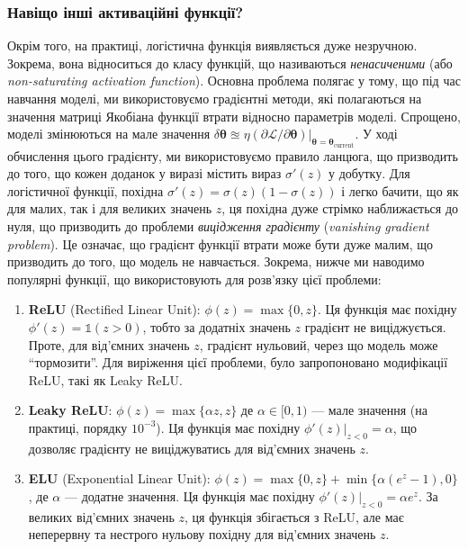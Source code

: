 \subsubsection{Навіщо інші активаційні функції?}
Окрім того, на практиці, логістична функція виявляється дуже незручною. Зокрема,
вона відноситься до класу функцій, що називаються \textit{ненасиченими} (або
\textit{non-saturating activation function}). Основна проблема полягає у тому,
що під час навчання моделі, ми використовуємо градієнтні методи, які полагаються
на значення матриці Якобіана функції втрати відносно параметрів моделі.
Спрощено, моделі змінюються на мале значення $\delta\boldsymbol{\theta}
\approxeq \eta
(\partial\mathcal{L}/\partial\boldsymbol{\theta})\Big|_{\boldsymbol{\theta}=\boldsymbol{\theta}_{\text{current}}}$.
У ході обчислення цього градієнту, ми використовуємо правило ланцюга, що
призводить до того, що кожен доданок у виразі містить вираз $\sigma'(z)$ у
добутку. Для логістичної функції, похідна $\sigma'(z) = \sigma(z)(1-\sigma(z))$ і
легко бачити, що як для малих, так і для великих значень $z$, ця похідна
дуже стрімко наближається до нуля, що призводить до проблеми \textit{вицідження
градієнту} (\textit{vanishing gradient problem}). Це означає, що градієнт
функції втрати може бути дуже малим, що призводить до того, що модель не
навчається. Зокрема, нижче ми наводимо популярні функції, що використовують 
для розв'язку цієї проблеми:
\begin{enumerate}
	\item \textbf{ReLU} (Rectified Linear Unit): $\phi(z) = \max\{0,z\}$. Ця 
	функція має похідну $\phi'(z) = \mathds{1}(z>0)$, тобто за додатніх
	значень $z$ градієнт не виціджується. Проте, для від'ємних значень $z$,
	градієнт нульовий, через що модель може ``тормозити''. Для виріження цієї 
	проблеми, було запропоновано модифікації ReLU, такі як Leaky ReLU.
	\item \textbf{Leaky ReLU}: $\phi(z) = \max\{\alpha z,z\}$ де $\alpha \in
	[0,1)$ --- мале значення (на практиці, порядку $10^{-3}$). Ця функція має
	похідну $\phi'(z)\Big|_{z<0} = \alpha$, що дозволяє градієнту не
	виціджуватись для від'ємних значень $z$.
	\item \textbf{ELU} (Exponential Linear Unit): $\phi(z) =
	\max\{0,z\}+\min\{\alpha(e^z-1),0\}$, де $\alpha$ --- додатне значення. Ця
	функція має похідну $\phi'(z)\Big|_{z<0} = \alpha e^z$. За великих від'ємних
	значень $z$, ця функція збігається з ReLU, але має неперервну та нестрого
	нульову похідну для від'ємних значень $z$.
\end{enumerate}

